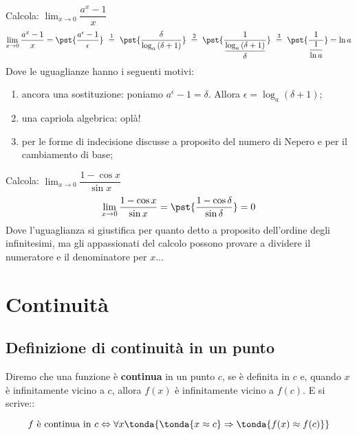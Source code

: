 \begin{esempio}
Calcola: \quad 
  \(\displaystyle \lim_{x \rightarrow 0} \dfrac{a^x-1}{x}\)
\begin{align*}
\lim_{x \rightarrow 0} \dfrac{a^x-1}{x} =
\pst{\dfrac{a^\epsilon-1}{\epsilon}}
~ \stackrel{1}{=} ~  
\pst{\dfrac{\delta}{\log_a{(\delta+1)}}}
~ \stackrel{2}{=} ~
\pst{\frac{1}{\dfrac{\log_a{(\delta+1)}}{\delta}}}
~ \stackrel{3}{=} ~ 
\pst{\frac{1}{\dfrac{1}{\ln{a}}}}=\ln{a}
\end{align*}
Dove le uguaglianze hanno i seguenti motivi:
\begin{enumerate} [nosep]
 \item ancora una sostituzione: poniamo
\(a^\epsilon-1=\delta\). Allora \(\epsilon=\log_a(\delta+1)\);
 \item una capriola algebrica: oplà! 
 \item per le forme di indecisione discusse a proposito del numero di Nepero
e per il cambiamento di base;
\end{enumerate}
\end{esempio}

\begin{esempio}
Calcola: \quad 
  \(\displaystyle \lim_{x \rightarrow 0} \dfrac{1-\cos x}{\sin x}\)
\[\lim_{x \rightarrow 0} \dfrac{1-\cos x}{\sin x} =
  \pst{\dfrac{1-\cos \delta}{\sin \delta}}=0\]
Dove l'uguaglianza si giustifica per quanto detto a proposito dell'ordine 
degli infinitesimi, ma gli appassionati del calcolo possono provare a 
dividere il numeratore e il denominatore per \(x\)...
\end{esempio}



\section{Continuità}
\label{sec:cont_continuita}

\subsection{Definizione di continuità in un punto}
\label{subsec:cont_definizione}


\begin{definizione}
Diremo che una funzione è \textbf{continua} in un punto \(c\), 
se è definita in \(c\) e, 
quando \(x\) è infinitamente vicino a \(c\), 
allora \(f(x)\) è infinitamente vicino a \(f(c)\). E si scrive::

\[f \text{ è continua in } c \Leftrightarrow 
\forall x \tonda{\tonda{x \approx c} \Rightarrow 
\tonda{f(x) \approx f(c)}}\]

\end{definizione}

